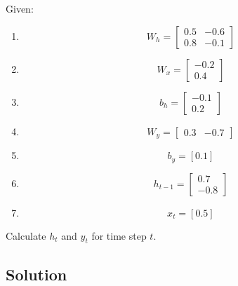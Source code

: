 \documentclass[12pt, xcolor=dvipsnames,svgnames,x11names]{article}
\begin{document}
Given:

\begin{enumerate}

    \item 
    \begin{equation}
        W_h = \begin{bmatrix} 0.5 & -0.6 \\ 0.8 & -0.1 \end{bmatrix}
    \end{equation}

    \item \begin{equation}
        W_x = \begin{bmatrix} -0.2 \\ 0.4 \end{bmatrix}
    \end{equation}

    \item \begin{equation}
        b_h = \begin{bmatrix} -0.1 \\ 0.2 \end{bmatrix}
    \end{equation}
    \item \begin{equation}
        W_y = \begin{bmatrix} 0.3 & -0.7 \end{bmatrix}
    \end{equation}

    \item \begin{equation}
        b_y = [0.1]
    \end{equation}

    \item \begin{equation}
        h_{t-1} = \begin{bmatrix} 0.7 \\ -0.8 \end{bmatrix}
    \end{equation}

    \item \begin{equation}
        x_t = [0.5]
    \end{equation}
\end{enumerate}

Calculate $h_t$ and $y_t$ for time step $t$.

\subsection{Solution}
\end{document}
